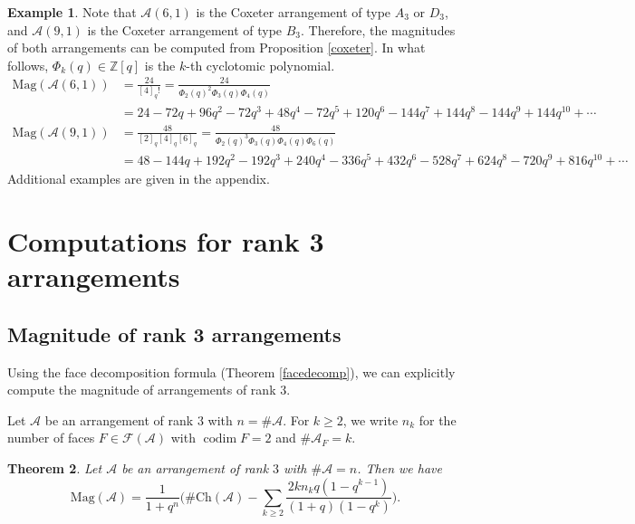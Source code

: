 \documentclass{amsart}
\numberwithin{equation}{section}
\newtheorem{thm}{Theorem}[section]
\theoremstyle{plain}
\theoremstyle{remark}
\theoremstyle{definition}
\newtheorem{ex}[thm]{Example}
\numberwithin{equation}{section}
\newcommand{\A}{\mathcal{A}}
\newcommand{\FF}{\mathcal{F}}
\newcommand{\Z}{\mathbb{Z}}
\newcommand{\Mag}{\mathrm{Mag}}
\newcommand{\Ch}{\mathrm{Ch}}
\DeclareMathOperator{\codim}{codim}
\begin{document}
\begin{ex}\label{Coxeterrank3}
Note that $\A(6,1)$ is the Coxeter arrangement of type $A_3$ or $D_3$, and $\A(9,1)$ is the Coxeter arrangement of type $B_3$.
Therefore, the magnitudes of both arrangements can be computed from Proposition \ref{coxeter}. In what follows, $\Phi_k(q)\in\Z[q]$ is the $k$-th cyclotomic polynomial.
\begin{align*}
    \Mag(\A(6,1))&=\frac{24}{[4]_q!}=\frac{24}{\Phi_2(q)^2\Phi_3(q)\Phi_4(q)}\\
    &=24-72q+96q^2-72q^3+48q^4-72q^5+120q^6-144q^7+144q^8-144q^9+144q^{10}+\cdots
\end{align*}
\begin{align*}
    \Mag(\A(9,1))&=\frac{48}{[2]_q[4]_q[6]_q}=\frac{48}{\Phi_2(q)^3\Phi_3(q)\Phi_4(q)\Phi_6(q)}\\
    &=48-144q+192q^2-192q^3+240q^4-336q^5+432q^6-528q^7+624q^8-720q^9+816q^{10}+\cdots
\end{align*}
Additional examples are given in the appendix.
\end{ex}

\section{Computations for rank 3 arrangements}

\subsection{Magnitude of rank 3 arrangements}
Using the face decomposition formula (Theorem \ref{facedecomp}), we can explicitly compute the magnitude of arrangements of rank $3$.

Let $\A$ be an arrangement of rank $3$ with $n=\#\A$.
For $k\geq 2$, we write $n_k$ for the number of faces $F\in \FF(\A)$ with $\codim F=2$ and $\#\A_F=k$.

\begin{thm}\label{thm:rank3}
    Let $\A$ be an arrangement of rank $3$ with $\#\A=n$.
    Then we have
    \[
    \Mag(\A)=\dfrac{1}{1+q^n}\biggl(\#\Ch(\A)-\sum_{k\geq 2}\dfrac{2kn_kq(1-q^{k-1})}{(1+q)(1-q^k)}\biggr).
    \]
\end{thm}
\end{document}
